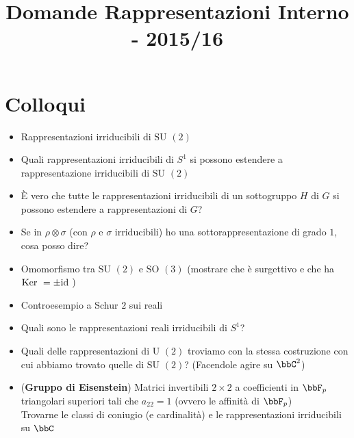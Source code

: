 \documentclass[a4paper,NoNotes,GeneralMath]{stdmdoc}
\newcommand{\SU}{\text{SU }}
\newcommand{\SO}{\text{SO }}
\newcommand{\U}{\text{U }}
\begin{document}
	\title{Domande Rappresentazioni Interno - 2015/16}

	\section*{Colloqui}
	\begin{itemize}
		\item Rappresentazioni irriducibili di $\SU(2)$
		\item Quali rappresentazioni irriducibili di $S^1$ si possono estendere a rappresentazione irriducibili di $\SU(2)$
		\item È vero che tutte le rappresentazioni irriducibili di un sottogruppo $H$ di $G$ si possono estendere a rappresentazioni di $G$?
		\item Se in $\rho \otimes \sigma$ (con $\rho$ e $\sigma$ irriducibili) ho una sottorappresentazione di grado $1$, cosa posso dire?
		\item Omomorfismo tra $\SU(2)$ e $\SO(3)$ (mostrare che è surgettivo e che ha $\mbox{Ker } = \pm \mbox{id}$ )
		\item Controesempio a Schur $2$ sui reali
		\item Quali sono le rappresentazioni reali irriducibili di $S^1$?
		\item Quali delle rappresentazioni di $\U(2)$ troviamo con la stessa costruzione con cui abbiamo trovato quelle di $\SU(2)$? (Facendole agire su $\bbC^2$)
		\item ({\bf Gruppo di Eisenstein}) Matrici invertibili $2\times 2$ a coefficienti in $\bbF_p$ triangolari superiori tali che $a_{22} = 1$ (ovvero le affinità di $\bbF_p$) \\
			Trovarne le classi di coniugio (e cardinalità) e le rappresentazioni irriducibili su $\bbC$
	\end{itemize}
\end{document}

